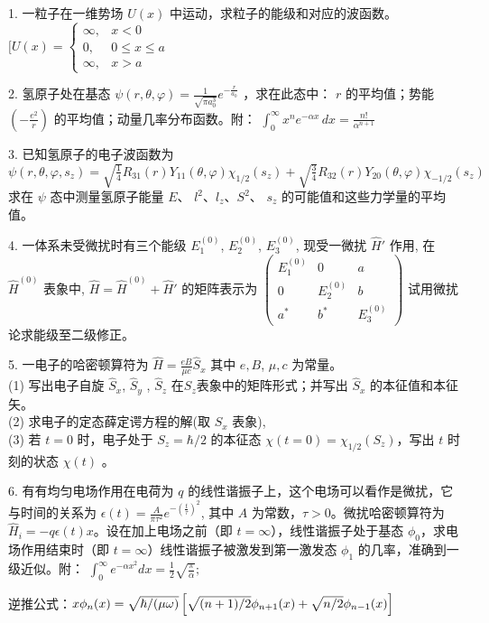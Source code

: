 1. 一粒子在一维势场 $U(x)$ 中运动，求粒子的能级和对应的波函数。
$[ U(x) = \begin{cases} \infty, & x < 0 \\0, & 0 \le x \le a \\\infty, & x > a \end{cases}$

2. 氢原子处在基态 $\psi (r, \theta, \varphi) = \frac{1}{\sqrt{\pi a_0^3}} e^{-\frac{r}{a_0}}$ ，求在此态中： $r$ 的平均值；势能 $( -\frac{e^2}{r} )$ 的平均值；动量几率分布函数。附： 
$\int_0^\infty x^n e^{-\alpha x} \, dx = \frac{n!}{\alpha^{n+1}}$

3. 已知氢原子的电子波函数为 
$\psi(r, \theta, \varphi, s_z) = \sqrt{\frac{1}{4}} R_{31}(r) Y_{11}(\theta, \varphi) \chi_{1/2}(s_z) + \sqrt{\frac{3}{4}} R_{32}(r) Y_{20}(\theta, \varphi) \chi_{-1/2}(s_z)$
求在 $\psi$ 态中测量氢原子能量 $E$、 $l^2$、$l_z$、$ S^2 $、 $s_z$ 的可能值和这些力学量的平均值。

4. 一体系未受微扰时有三个能级 $E_1^{(0)}$, $E_2^{(0)}$, $E_3^{(0)}$, 现受一微扰 $\hat{H}'$ 作用, 在 $\hat{H}^{(0)}$ 表象中, 
$\hat{H} = \hat{H}^{(0)} + \hat{H}'$
的矩阵表示为
$\begin{pmatrix}E_1^{(0)} & 0 & a \\0 & E_2^{(0)} & b \\a^* & b^* & E_3^{(0)}\end{pmatrix}$
试用微扰论求能级至二级修正。

5. 一电子的哈密顿算符为
$\hat{H} = \frac{eB}{\mu c} \hat{S}_x$
其中 $e, B$, $\mu, c$ 为常量。\\
(1) 写出电子自旋 $\hat{S}_x $, $\hat{S}_y$ , $\hat{S}_z$  在$S_z$表象中的矩阵形式；并写出 $\hat{S}_x$ 的本征值和本征矢。\\
(2) 求电子的定态薛定谔方程的解(取 $S_x$ 表象),\\
(3) 若 $t = 0$ 时，电子处于 $S_z = \hbar/2$ 的本征态 $\chi(t=0) = \chi_{1/2}(S_z)$，写出 $t$ 时刻的状态 $\chi(t)$ 。


6. 有有均匀电场作用在电荷为 $q$ 的线性谐振子上，这个电场可以看作是微扰，它与时间的关系为 
$\epsilon(t) = \frac{A}{\pi \tau^2} e^{-\left(\frac{t}{\tau}\right)^2}$,
其中 $A$ 为常数，$\tau > 0$。微扰哈密顿算符为 $\hat{H}_i = -q\epsilon(t)x$。设在加上电场之前（即 $t = \infty$），线性谐振子处于基态 $\phi_0$，求电场作用结束时（即 $t = \infty$）线性谐振子被激发到第一激发态 $\phi_1$ 的几率，准确到一级近似。附：
$\int_{0}^{\infty} e^{-\alpha x^2} dx = \frac{1}{2} \sqrt{\frac{\pi}{\alpha}};$

逆推公式：$x \phi_n(x) = \sqrt{\hbar / (\mu \omega)} \left[ \sqrt{(n+1)/2} \\ \phi_{n+1}(x) + \sqrt{n/2} \\ \phi_{n-1}(x) \right]$


